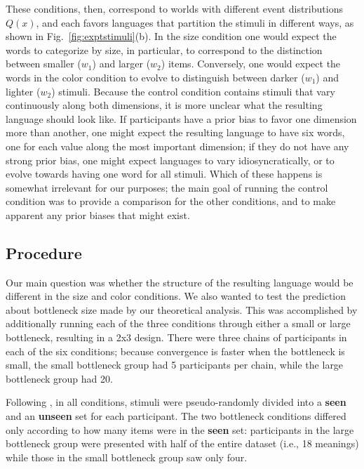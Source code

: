 \documentclass{apa}
\begin{document}
These conditions, then, correspond to worlds with different event distributions $Q(x)$, and each favors languages that partition the stimuli in different ways, as shown in Fig.~\ref{fig:exptstimuli}(b). In the {\sc size} condition one would expect the words to categorize by size, in particular, to correspond to the distinction between smaller ($w_1$) and larger ($w_2$) items. Conversely, one would expect the words in the {\sc color} condition to evolve to distinguish between darker ($w_1$) and lighter ($w_2$) stimuli. Because the {\sc control} condition contains stimuli that vary continuously along both dimensions, it is more unclear what the resulting language should look like. If participants have a prior bias to favor one dimension more than another, one might expect the resulting language to have six words, one for each value along the most important dimension; if they do not have any strong prior bias, one might expect languages to vary idiosyncratically, or to evolve towards having one word for all stimuli. Which of these happens is somewhat irrelevant for our purposes; the main goal of running the {\sc control} condition was to provide a comparison for the other conditions, and to make apparent any prior biases that might exist.

 \subsection{Procedure}

Our main question was whether the structure of the resulting language would be different in the {\sc size} and {\sc color} conditions.  We also wanted to test the prediction about bottleneck size made by our theoretical analysis. This was accomplished by additionally running each of the three conditions through either a small or large bottleneck, resulting in a 2x3 design. There were three chains of participants in each of the six conditions; because convergence is faster when the bottleneck is small, the {\sc small} bottleneck group had 5 participants per chain, while the {\sc large} bottleneck group had 20.

Following , in all conditions, stimuli were pseudo-randomly divided into a {\bf seen} and an {\bf unseen} set for each participant. The two bottleneck conditions differed only according to how many items were in the {\bf seen} set: participants in the {\sc large} bottleneck group were presented with half of the entire dataset (i.e., 18 meanings) while those in the {\sc small} bottleneck group saw only four.
\end{document}
